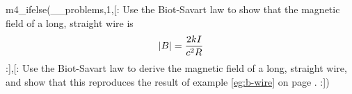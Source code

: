 m4_ifelse(__problems,1,[:%
        Use the Biot-Savart law to show that the magnetic field of a long, straight wire
        is 
        \begin{equation*}
                | B| = \frac{2 kI}{ c^2 R}\\
        \end{equation*}
:],[:%
        Use the Biot-Savart law to derive the magnetic field of a long, straight wire,
        and show that this reproduces the result of example \ref{eg:b-wire} on page 
        \pageref{eg:b-wire}.
:])
